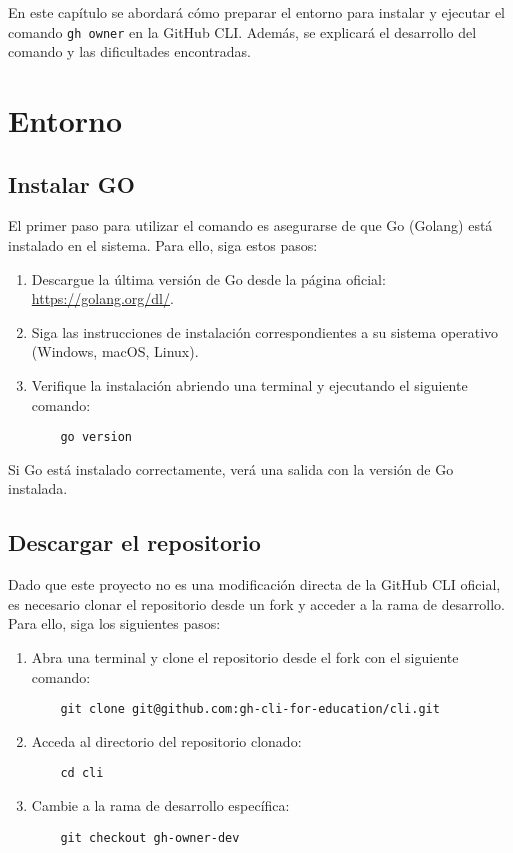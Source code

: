 En este capítulo se abordará cómo preparar el entorno para instalar y ejecutar el comando \texttt{gh owner} en la GitHub CLI. Además, se explicará el desarrollo del comando y las dificultades encontradas.

\section{Entorno}

\subsection{Instalar GO}

El primer paso para utilizar el comando es asegurarse de que Go (Golang) está instalado en el sistema. Para ello, siga estos pasos:

\begin{enumerate}
  \item Descargue la última versión de Go desde la página oficial: \url{https://golang.org/dl/}.
  \item Siga las instrucciones de instalación correspondientes a su sistema operativo (Windows, macOS, Linux).
  \item Verifique la instalación abriendo una terminal y ejecutando el siguiente comando:
        \begin{verbatim}
    go version
  \end{verbatim}
\end{enumerate}

Si Go está instalado correctamente, verá una salida con la versión de Go instalada.

\subsection{Descargar el repositorio}

Dado que este proyecto no es una modificación directa de la GitHub CLI oficial, es necesario clonar el repositorio desde un fork y acceder a la rama de desarrollo. Para ello, siga los siguientes pasos:

\begin{enumerate}
  \item Abra una terminal y clone el repositorio desde el fork con el siguiente comando:
        \begin{verbatim}
    git clone git@github.com:gh-cli-for-education/cli.git
  \end{verbatim}
  \item Acceda al directorio del repositorio clonado:
        \begin{verbatim}
    cd cli
  \end{verbatim}
  \item Cambie a la rama de desarrollo específica:
        \begin{verbatim}
    git checkout gh-owner-dev
  \end{verbatim}
\end{enumerate}

